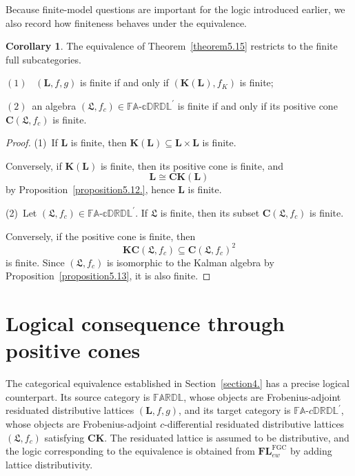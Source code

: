 \documentclass[final,12pt,times]{elsarticle}
\theoremstyle{plain}
\theoremstyle{definition}
\newtheorem{corollary}[definition]{Corollary}
\theoremstyle{break}
\newcommand{\FARDL}{\mathbb{FARDL}}
\newcommand{\CFAD}{\mathbb{FA\text{-}cDRDL}}
\newcommand{\CFADp}{\mathbb{FA\text{-}cDRDL}^{\prime}}
\newcommand{\FLFGC}{\mathbf{FL}^{\mathrm{FGC}}_{ew}}
\newcommand{\Kfun}{\mathbf K}
\newcommand{\Cfun}{\mathbf C}
\begin{document}
Because finite-model questions are important for the logic introduced earlier,
we also record how finiteness behaves under the equivalence. 
\begin{corollary}\label{cor:finite}
The equivalence of Theorem~\ref{theorem5.15} restricts to the
finite full subcategories.

 $(1)$~ $(\mathbf{L},f,g)$ is finite if and only if $(\Kfun(\mathbf{L}),f_K)$ is finite;
 
 $(2)$~an algebra $(\boldsymbol{\mathfrak{L}},f_c)\in\CFADp$ is finite if and only if
       its positive cone $\Cfun(\boldsymbol{\mathfrak{L}},f_c)$ is finite.
\end{corollary}

\begin{proof}
(1)~If $\mathbf{L}$ is finite, then $\Kfun(\mathbf{L})\subseteq \mathbf{L}\times \mathbf{L}$ is finite. 

 Conversely,
if $\Kfun(\mathbf{L})$ is finite, then its positive cone is finite, and
\[
 \mathbf{L}\cong\Cfun\Kfun(\mathbf{L})
\]
by Proposition~\ref{proposition5.12.}, hence $\mathbf{L}$ is finite.

(2)~Let $(\boldsymbol{\mathfrak{L}},f_c)\in\CFADp$.  If $\boldsymbol{\mathfrak{L}}$ is
finite, then its subset $\Cfun(\boldsymbol{\mathfrak{L}},f_c)$ is finite.  

Conversely,
if the positive cone is finite, then
\[
 \Kfun\Cfun(\boldsymbol{\mathfrak{L}},f_c)
 \subseteq
 \Cfun(\boldsymbol{\mathfrak{L}},f_c)^2
\]
is finite.  Since $(\boldsymbol{\mathfrak{L}},f_c)$ is isomorphic to the Kalman algebra
by Proposition~\ref{proposition5.13}, it is also finite.
\end{proof}

\section{Logical consequence through positive cones}\label{sec:positive-cones}

\renewcommand{\CFAD}{\mathbb{FA}\text{-}c\mathbb{DRDL}}
\renewcommand{\CFADp}{\mathbb{FA}\text{-}c\mathbb{DRDL}^{\prime}}

The categorical equivalence established in Section~\ref{section4.} has a
precise logical counterpart.  Its source category is \(\FARDL\), whose
objects are Frobenius-adjoint residuated distributive lattices
\((\mathbf L,f,g)\), and its target category is \(\CFADp\), whose objects are
Frobenius-adjoint \(c\)-differential residuated distributive lattices
\((\boldsymbol{\mathfrak L},f_c)\) satisfying \(\mathbf{CK}\).  The
residuated lattice is assumed to be distributive, and the logic
corresponding to the equivalence is obtained from \(\FLFGC\) by adding
lattice distributivity.  
\end{document}
